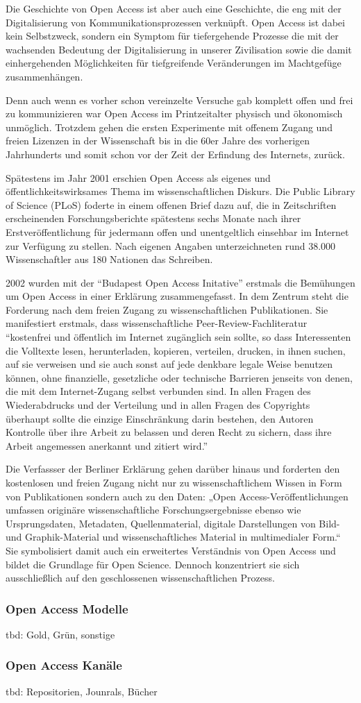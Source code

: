 Die Geschichte von Open Access ist aber auch eine Geschichte, die eng mit der Digitalisierung von Kommunikationsprozessen verknüpft. Open Access ist dabei kein Selbstzweck, sondern ein Symptom für tiefergehende Prozesse die mit der wachsenden Bedeutung der Digitalisierung in unserer Zivilisation sowie die damit einhergehenden Möglichkeiten für tiefgreifende Veränderungen im Machtgefüge zusammenhängen. 

Denn auch wenn es vorher schon vereinzelte Versuche gab komplett offen und frei zu kommunizieren war Open Access im Printzeitalter physisch und ökonomisch unmöglich\cite{cite:18}. Trotzdem gehen die ersten Experimente mit offenem Zugang und freien Lizenzen in der Wissenschaft bis in die 60er Jahre des vorherigen Jahrhunderts und somit schon vor der Zeit der Erfindung des Internets, zurück.


Spätestens im Jahr 2001 erschien Open Access als eigenes und öffentlichkeitswirksames Thema im wissenschaftlichen Diskurs\cite{cite:19}. Die Public Library of Science (PLoS) foderte in einem offenen Brief\cite{cite:20} dazu auf, die in Zeitschriften erscheinenden Forschungsberichte spätestens sechs Monate nach ihrer Erstveröffentlichung für jedermann offen und unentgeltlich einsehbar im Internet zur Verfügung zu stellen. Nach eigenen Angaben unterzeichneten rund 38.000 Wissenschaftler aus 180 Nationen das Schreiben.

2002 wurden mit der “Budapest Open Access Initative”\cite{cite:21} erstmals die Bemühungen um Open Access in einer Erklärung zusammengefasst. In dem Zentrum steht die Forderung nach dem freien Zugang zu wissenschaftlichen Publikationen. Sie manifestiert erstmals, dass wissenschaftliche Peer-Review-Fachliteratur “kostenfrei und öffentlich im Internet zugänglich sein sollte, so dass Interessenten die Volltexte lesen, herunterladen, kopieren, verteilen, drucken, in ihnen suchen, auf sie verweisen und sie auch sonst auf jede denkbare legale Weise benutzen können, ohne finanzielle, gesetzliche oder technische Barrieren jenseits von denen, die mit dem Internet-Zugang selbst verbunden sind. In allen Fragen des Wiederabdrucks und der Verteilung und in allen Fragen des Copyrights überhaupt sollte die einzige Einschränkung darin bestehen, den Autoren Kontrolle über ihre Arbeit zu belassen und deren Recht zu sichern, dass ihre Arbeit angemessen anerkannt und zitiert wird.” 

Die Verfassser der Berliner Erklärung gehen darüber hinaus und forderten den kostenlosen und freien Zugang nicht nur zu wissenschaftlichem Wissen in Form von Publikationen sondern auch zu den Daten: „Open Access-Veröffentlichungen umfassen originäre wissenschaftliche Forschungsergebnisse ebenso wie Ursprungsdaten, Metadaten, Quellenmaterial, digitale Darstellungen von Bild- und Graphik-Material und wissenschaftliches Material in multimedialer Form.“\cite{cite:22} Sie symbolisiert damit auch ein erweitertes Verständnis von Open Access und bildet die Grundlage für Open Science. Dennoch konzentriert sie sich ausschließlich auf den geschlossenen wissenschaftlichen Prozess.

\subsubsection{Open Access Modelle}
tbd: Gold, Grün, sonstige

\subsubsection{Open Access Kanäle}
tbd: Repositorien, Jounrals, Bücher
